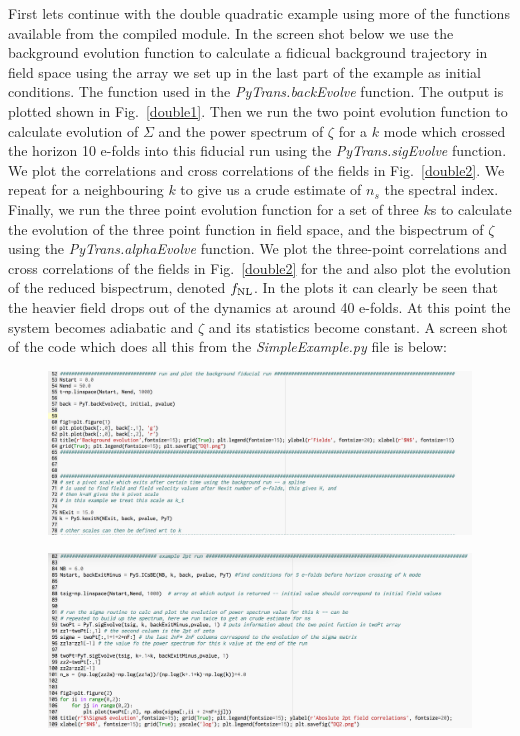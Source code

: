 \documentclass[10pt,
amsmath,amssymb,
aps,prd,nofootinbib,eqsecnum,a4paper]{revtex4}
\begin{document}
First lets continue with the double quadratic example using more of the functions 
available from the compiled module. In the screen shot below we use the background evolution 
function to calculate a fidicual background trajectory in field space using the array we set up in the last 
part of the example as initial conditions. The function used in the {\it PyTrans.backEvolve} function. 
The output is plotted shown in Fig.~\ref{double1}. Then we run the two point evolution function to calculate evolution 
of $\Sigma$ and the power spectrum of $\zeta$ for a $k$ mode which crossed the horizon 
10 e-folds into this fiducial run using the {\it PyTrans.sigEvolve} function. 
We plot the correlations and cross correlations of the fields in Fig.~\ref{double2}. 
We repeat for a neighbouring $k$ to give us a crude estimate of $n_s$ the spectral index. 
Finally, we run the three point evolution function for a set of three $k$s to calculate the evolution of 
the three point function in field space, and the bispectrum of $\zeta$ using the {\it PyTrans.alphaEvolve} function. 
We 
plot the three-point correlations and cross correlations of the fields in Fig.~\ref{double2} for the
and also plot the evolution of the reduced bispectrum, denoted $f_{\rm NL}$. In the plots it can clearly be 
seen that the heavier field drops out of the dynamics at around 40 e-folds. At this 
point the system becomes adiabatic and $\zeta$ and its statistics become constant.
A screen shot of the code which does all this from the {\it SimpleExample.py} file is below:
\begin{figure}[H]
\centering
\includegraphics[width=17.2cm]{Shot3}
\end{figure}
\begin{figure}[H]
\centering
\includegraphics[width=17.2cm]{Shot4}
\end{figure}
\end{document}

